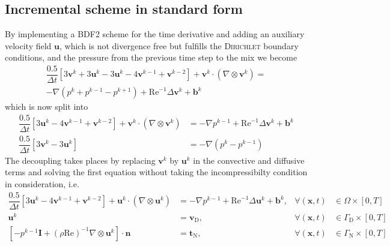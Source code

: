 \documentclass[]{scrartcl}
\begin{document}
\subsection{Incremental scheme in standard form}
By implementing a BDF2 scheme for the time derivative and adding an auxiliary velocity field $\mathbf{u}$, which is not divergence free but fulfills the \textsc{Dirichlet} boundary conditions, and the pressure from the previous time step to the mix we become
\begin{equation*}
\begin{split}
	\dfrac{0.5}{\Delta t} \left[3\mathbf{v}^{k} + 3\mathbf{u}^{k} - 3\mathbf{u}^{k} - 4\mathbf{v}^{k-1} + \mathbf{v}^{k-2}\right]  + \mathbf{v}^{k} \cdot (\nabla \otimes \mathbf{v}^{k})= \\  -\nabla (p^{k} + p^{k-1} - p^{k+1}) +  \mathrm{Re}^{-1} \Delta \mathbf{v}^{k} + \mathbf{b}^{k}
\end{split}
\end{equation*}
which is now split into
\begin{equation*}
	\begin{aligned}
		\dfrac{0.5}{\Delta t} \left[3\mathbf{u}^{k} - 4\mathbf{v}^{k-1} + \mathbf{v}^{k-2}\right]  + \mathbf{v}^{k} \cdot (\nabla \otimes \mathbf{v}^{k}) &= -\nabla p^{k-1} +  \mathrm{Re}^{-1} \Delta \mathbf{v}^{k} + \mathbf{b}^{k} \\
		\dfrac{0.5}{\Delta t} \left[3\mathbf{v}^{k} - 3\mathbf{u}^{k} \right] &= -\nabla (p^{k} - p^{k-1})
	\end{aligned}
\end{equation*}
The decoupling takes places by replacing $\mathbf{v}^{k}$ by $\mathbf{u}^{k}$ in the convective and diffusive terms and solving the first equation without taking the incompressibilty condition in consideration, i.e.
\begin{equation*}
	\begin{aligned}
		\dfrac{0.5}{\Delta t} \left[3\mathbf{u}^{k} - 4\mathbf{v}^{k-1} + \mathbf{v}^{k-2}\right]  + \mathbf{u}^{k} \cdot (\nabla \otimes \mathbf{u}^{k}) &= -\nabla p^{k-1} +  \mathrm{Re}^{-1} \Delta \mathbf{u}^{k} + \mathbf{b}^{k}, &\forall (\mathbf{x}, t) &\in \Omega \times \left[0, T \right]  \\
		\mathbf{u}^{k} &= \mathbf{v}_\textrm{D}, &\forall (\mathbf{x}, t) &\in \Gamma_\textrm{D} \times \left[0, T \right] \\
		[-p^{k-1} \mathbf{I} + (\rho\textrm{Re})^{-1}\nabla \otimes \mathbf{u}^{k}]\cdot \mathbf{n} &= \mathbf{t}_\textrm{N}, &\forall \left(\mathbf{x}, t\right) &\in \Gamma_\textrm{N} \times \left[0, T \right]
	\end{aligned}
\end{equation*}
\end{document}
